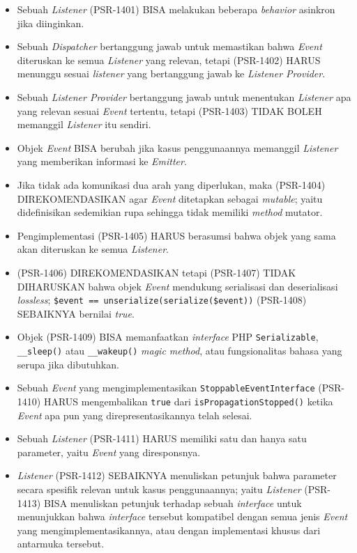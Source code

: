 \begin{itemize}
	\item Sebuah \textit{Listener} (PSR-1401) BISA melakukan beberapa \textit{behavior} asinkron jika diinginkan.
	\item Sebuah \textit{Dispatcher} bertanggung jawab untuk memastikan bahwa \textit{Event} diteruskan ke semua \textit{Listener} yang relevan, tetapi (PSR-1402) HARUS menunggu sesuai \textit{listener} yang bertanggung jawab ke \textit{Listener Provider}.
	\item Sebuah \textit{Listener Provider} bertanggung jawab untuk menentukan \textit{Listener} apa yang relevan sesuai \textit{Event} tertentu, tetapi (PSR-1403) TIDAK BOLEH memanggil \textit{Listener} itu sendiri.
	\item Objek \textit{Event} BISA berubah jika kasus penggunaannya memanggil \textit{Listener} yang memberikan informasi ke \textit{Emitter}.
	\item Jika tidak ada komunikasi dua arah yang diperlukan, maka (PSR-1404) DIREKOMENDASIKAN agar \textit{Event} ditetapkan sebagai \textit{mutable}; yaitu didefinisikan sedemikian rupa sehingga tidak memiliki \textit{method} mutator.
	\item Pengimplementasi (PSR-1405) HARUS berasumsi bahwa objek yang sama akan diteruskan ke semua \textit{Listener}.
	\item (PSR-1406) DIREKOMENDASIKAN tetapi (PSR-1407) TIDAK DIHARUSKAN bahwa objek \textit{Event} mendukung serialisasi dan deserialisasi \textit{lossless}; \verb|$event == unserialize(serialize($event))| (PSR-1408) SEBAIKNYA bernilai  \textit{true}.
	\item Objek (PSR-1409) BISA memanfaatkan \textit{interface} PHP \verb|Serializable|, \verb|__sleep()| atau \verb|__wakeup()| \textit{magic method}, atau fungsionalitas bahasa yang serupa jika dibutuhkan.
	\item Sebuah \textit{Event} yang mengimplementasikan \verb|StoppableEventInterface| (PSR-1410) HARUS mengembalikan \verb|true| dari \verb|isPropagationStopped()| ketika \textit{Event} apa pun yang direpresentasikannya telah selesai.
	\item Sebuah \textit{Listener} (PSR-1411) HARUS memiliki satu dan hanya satu parameter, yaitu \textit{Event} yang diresponsnya.
	\item \textit{Listener} (PSR-1412) SEBAIKNYA menuliskan petunjuk bahwa parameter secara spesifik relevan untuk kasus penggunaannya; yaitu \textit{Listener} (PSR-1413) BISA menuliskan petunjuk terhadap sebuah \textit{interface} untuk menunjukkan bahwa \textit{interface} tersebut kompatibel dengan semua jenis \textit{Event} yang mengimplementasikannya, atau dengan implementasi khusus dari antarmuka tersebut.
\end{itemize}

